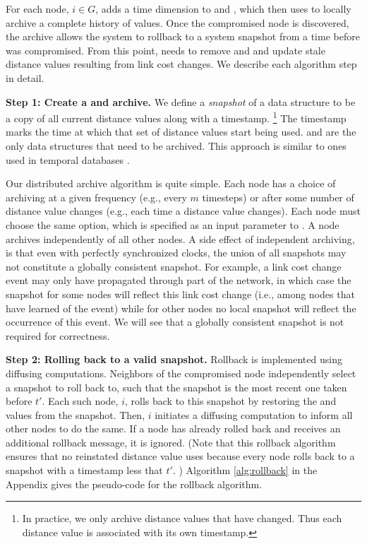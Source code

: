 For each node, $i \in G$, \cpr adds a time dimension to \minvi and \dmatrixis, which \cpr then uses to locally archive a complete history of values. 
Once the compromised node is discovered, 
the archive allows the system to rollback to 
a system snapshot from a time before \bad was compromised. From this point, \cpr needs to remove \bad and \oldvector and update stale distance values resulting from link cost changes.
We describe each algorithm step in detail. %

{\bf Step 1: Create a \minv and \dmatrix archive.} 
	We define a  \emph{snapshot} of a data structure to be a copy of all current distance values along with a timestamp.
	{\footnote {\small In practice, we only archive distance values that have changed. Thus each distance value is associated with its own timestamp.}}
	The timestamp marks the time at which that set of distance values start being used. 
	\minv and \dmatrix are the only data structures that need to be archived. This approach is similar to ones used in temporal databases 
  \cite{Jensen91,Lomet06}.

  Our distributed archive algorithm is quite simple.  %
	Each node has a choice of archiving at a given frequency (e.g., every $m$ timesteps) or after some number of distance value changes (e.g., each time a distance 
	value changes).  Each node must choose the same option, which is specified as an input parameter to \cprs. A node archives independently of all other nodes.
  A side effect of independent archiving, is that even with perfectly synchronized clocks, the union of all snapshots may not constitute a globally consistent snapshot. 
  For example, a link cost change event may only have propagated 
  through part of the network, in which case the snapshot for some nodes will reflect this link cost change (i.e., among nodes that have learned of the event) 
  while for other nodes no local snapshot will reflect the occurrence of this event. We will see that a globally consistent snapshot is not required for correctness.  

{\bf Step 2: Rolling back to a valid snapshot.} 
Rollback is implemented using diffusing computations. Neighbors of the compromised node independently select a snapshot to roll back to, such that the snapshot is the most recent one taken
before $t'$.  Each such node, $i$, rolls back to this snapshot by restoring the \minvi and \dmatrixi values from the snapshot.  Then, $i$ initiates a diffusing computation to inform all other
nodes to do the same. If a node has already rolled back and receives an additional rollback message, it is ignored. 
(Note that this rollback algorithm ensures that no reinstated distance value uses \badvector because every node rolls back to a snapshot 
with a timestamp less that $t'$. ) Algorithm \ref{alg:rollback} in the Appendix gives the pseudo-code for the rollback algorithm.


